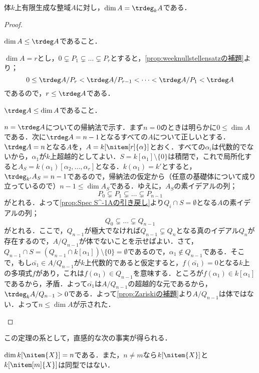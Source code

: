 \begin{thm}
	体$k$上有限生成な整域$A$に対し，$\dim A=\trdeg_k A$である．
\end{thm}
\begin{proof}
	\begin{step}
		\item $\dim A\leq\trdeg A$であること．
		
		$\dim A=r$とし，$0\subsetneq P _1\subsetneq\dots\subsetneq P _r$とすると，\ref{prop:weeknullstellensatzの補題}より；
		\[0\leq\trdeg A/ P _r<\trdeg A/ P _{r-1}<\dots<\trdeg A/ P _1<\trdeg A\]
		であるので，$r\leq\trdeg A$である．
		
		\item $\trdeg A\leq\dim A$であること．
		
		$n=\trdeg A$についての帰納法で示す．まず$n=0$のときは明らかに$0\leq\dim A$である．次に$\trdeg A=n-1$となるすべての$A$について正しいとする．$\trdeg A=n$となる$A$を，$A=k[\nitem[r]{\alpha}]$とおく．すべての$\alpha_i$は代数的でないから，$\alpha_1$が$k$上超越的としてよい．$S=k[\alpha_1]\setminus\{0\}$は積閉で，これで局所化すると$A_S=k(\alpha_1)[\alpha_2,\dots,\alpha_r]$となる．$k(\alpha_1)=k'$とすると，$\trdeg_{k'} A_S=n-1$であるので，帰納法の仮定から（任意の基礎体について成り立っているので）$n-1\leq\dim A_S$である．ゆえに，$A_S$の素イデアルの列；
		\[ P _0\subsetneq P _1\subsetneq\dots\subsetneq P _{n-1}\]
		がとれる．よって\ref{prop:Spec S^-1Aの引き戻し}より$ Q _i\cap S=\emptyset$となる$A$の素イデアルの列；
		\[ Q _0\subsetneq\dots\subsetneq Q _{n-1}\]
		がとれる．ここで，$ Q _{n-1}$が極大でなければ$ Q _{n-1}\subsetneq Q _n$となる真のイデアル$ Q _n$が存在するので，$A/ Q _{n-1}$が体でないことを示せばよい．さて，$ Q _{n-1}\cap S=( Q _{n-1}\cap k[\alpha_1])\setminus\{0\}=\emptyset$であるので，$\alpha_1\not\in Q _{n-1}$である．そこで，もし$\bar{\alpha_1}\in A/ Q _{n-1}$が$k$上代数的であると仮定すると，$f(\bar{\alpha_1})=0$となる$k$上の多項式$f$があり，これは$f(\alpha_1)\in Q _{n-1}$を意味する．ところが$f(\alpha_1)\in k[\alpha_1]$であるから，矛盾．よって$\bar{\alpha_1}$は$A/ Q _{n-1}$の超越的な元であるから，$\trdeg_k A/ Q _{n-1}>0$である．よって\ref{prop:Zariskiの補題}より$A/ Q _{n-1}$は体ではない．よって$n\leq\dim A$が示された．
	\end{step}
\end{proof}

この定理の系として，直感的な次の事実が得られる．
\begin{cor}\label{cor:多項式環の次元}
	$\dim k[\nitem{X}]=n$である．また，$n\neq m$なら$k[\nitem{X}]$と$k[\nitem[m]{X}]$は同型ではない．
\end{cor}

